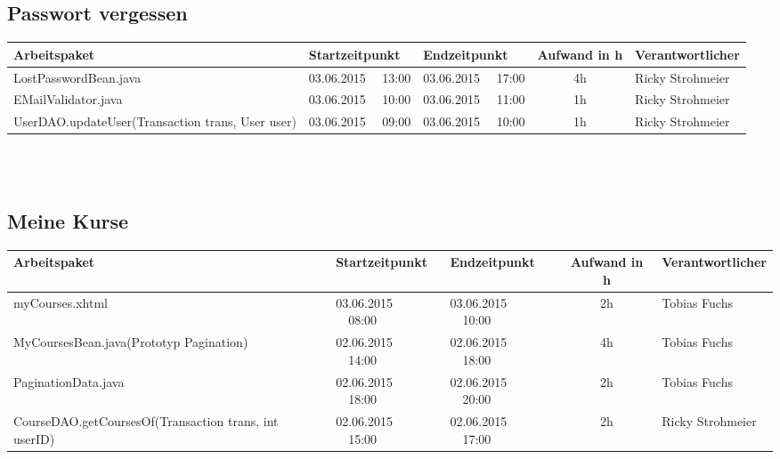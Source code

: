 \begin{landscape}
\subsection{Passwort vergessen}
\begin{tabular}{|p{10.3cm}|p{3.2cm}|p{3.2cm}|c|p{3.5cm}|}
	\hline  \textbf{Arbeitspaket} & \textbf{Startzeitpunkt} & \textbf{Endzeitpunkt} & \textbf{Aufwand in h} & \textbf{Verantwortlicher} \\ 
	\hline   LostPasswordBean.java                                & 03.06.2015 \ \ 13:00     & 03.06.2015 \ \ 17:00     &      4h             & Ricky Strohmeier\\ 
	\hline   EMailValidator.java                                  & 03.06.2015 \ \ 10:00     & 03.06.2015 \ \ 11:00     &      1h             & Ricky Strohmeier\\ 
	\hline   UserDAO.updateUser(Transaction trans, User user)     & 03.06.2015 \ \ 09:00     & 03.06.2015 \ \ 10:00     &      1h             & Ricky Strohmeier\\ 
	\hline 
\end{tabular} \ \\
\ \\

\subsection{Meine Kurse}
\begin{tabular}{|p{10.3cm}|p{3.2cm}|p{3.2cm}|c|p{3.5cm}|}
	\hline  \textbf{Arbeitspaket} & \textbf{Startzeitpunkt} & \textbf{Endzeitpunkt} & \textbf{Aufwand in h} & \textbf{Verantwortlicher} \\ 
	\hline   myCourses.xhtml                                       & 03.06.2015 \ \ 08:00       & 03.06.2015  \ \  10:00      &  2h              & Tobias Fuchs\\
	\hline   MyCoursesBean.java(Prototyp Pagination)               & 02.06.2015 \ \ 14:00       & 02.06.2015  \ \  18:00      &  4h              & Tobias Fuchs\\
	\hline   PaginationData.java                                   & 02.06.2015 \ \ 18:00       & 02.06.2015  \ \  20:00      &  2h              & Tobias Fuchs\\
	\hline   CourseDAO.getCoursesOf(Transaction trans, int userID) & 02.06.2015 \ \ 15:00       & 02.06.2015  \ \  17:00      &  2h              & Ricky Strohmeier\\
	\hline 
\end{tabular} \ \\
\ \\


\end{landscape}
